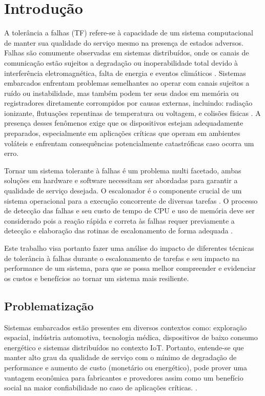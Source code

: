 \chapter{Introdução}
\label{cap:intro}

A tolerância a falhas (TF) refere-se à capacidade de um sistema computacional de manter sua qualidade do serviço mesmo na presença de estados adversos. Falhas são comumente observadas em sistemas distribuídos, onde os canais de comunicação estão sujeitos a degradação ou inoperabilidade total devido à interferência eletromagnética, falta de energia e eventos climáticos \cite{FaultTolerantSystems}. Sistemas embarcados enfrentam problemas semelhantes ao operar com canais sujeitos a ruído ou instabilidade, mas também podem ter seus dados em memória ou registradores diretamente corrompidos por causas externas, incluindo: radiação ionizante, flutuações repentinas de temperatura ou voltagem, e colisões físicas \cite{DependabilityInEmbeddedSystems}. A presença desses fenômenos exige que os dispositivos estejam adequadamente preparados, especialmente em aplicações críticas que operam em ambientes voláteis e enfrentam consequências potencialmente catastróficas caso ocorra um erro.

Tornar um sistema tolerante à falhas é um problema multi facetado, ambas soluções em hardware e software necessitam ser abordadas para garantir a qualidade de serviço desejada. O escalonador é o componente crucial de um sistema operacional para a execução concorrente de diversas tarefas \cite{OperatingSystemConcepts}. O processo de detecção das falhas e seu custo de tempo de CPU e uso de memória deve ser considerado pois a reação rápida e correta às falhas requer previamente a detecção e elaboração das rotinas de escalonamento de forma adequada \cite{DependabilityInEmbeddedSystems}.

Este trabalho visa portanto fazer uma análise do impacto de diferentes técnicas de tolerância à falhas durante o escalonamento de tarefas e seu impacto na performance de um sistema, para que se possa melhor compreender e evidenciar os custos e benefícios ao tornar um sistema mais resiliente. 

\section{Problematização}

Sistemas embarcados estão presentes em diversos contextos como: exploração espacial, indústria automotiva, tecnologia médica, dispositivos de baixo consumo energético e sistemas distribuídos no contexto IoT. Portanto, entende-se que manter alto grau da qualidade de serviço com o mínimo de degradação de performance e aumento de custo (monetário ou energético), pode prover uma vantagem econômica para fabricantes e provedores assim como um benefício social na maior confiabilidade no caso de aplicações críticas. \cite{DependabilityInEmbeddedSystems}.


